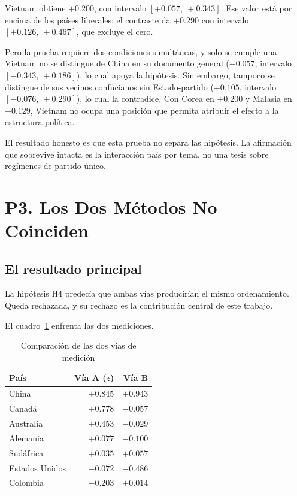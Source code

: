 Vietnam obtiene $+0.200$, con intervalo $[+0.057,\ +0.343]$. Ese valor está por encima de los países liberales: el contraste da $+0.290$ con intervalo $[+0.126,\ +0.467]$, que excluye el cero.

Pero la prueba requiere dos condiciones simultáneas, y solo se cumple una. Vietnam no se distingue de China en su documento general ($-0.057$, intervalo $[-0.343,\ +0.186]$), lo cual apoya la hipótesis. Sin embargo, tampoco se distingue de sus vecinos confucianos sin Estado-partido ($+0.105$, intervalo $[-0.076,\ +0.290]$), lo cual la contradice. Con Corea en $+0.200$ y Malasia en $+0.129$, Vietnam no ocupa una posición que permita atribuir el efecto a la estructura política.

El resultado honesto es que esta prueba no separa las hipótesis. La afirmación que sobrevive intacta es la interacción país por tema, no una tesis sobre regímenes de partido único.

\section{P3. Los Dos Métodos No Coinciden}
\label{sec:res-p3}

\subsection{El resultado principal}

La hipótesis H4 predecía que ambas vías producirían el mismo ordenamiento. Queda rechazada, y su rechazo es la contribución central de este trabajo.

El cuadro~\ref{tab:vias} enfrenta las dos mediciones.

\begin{table}[htbp]
\centering
\caption{Comparación de las dos vías de medición}
\label{tab:vias}
\begin{tabular}{lrr}
\hline
\textbf{País} & \textbf{Vía A ($z$)} & \textbf{Vía B} \\
\hline
China & $+0.845$ & $+0.943$ \\
Canadá & $+0.778$ & $-0.057$ \\
Australia & $+0.453$ & $-0.029$ \\
Alemania & $+0.077$ & $-0.100$ \\
Sudáfrica & $+0.035$ & $+0.057$ \\
Estados Unidos & $-0.072$ & $-0.486$ \\
Colombia & $-0.203$ & $+0.014$ \\
\hline
\end{tabular}
\end{table}

